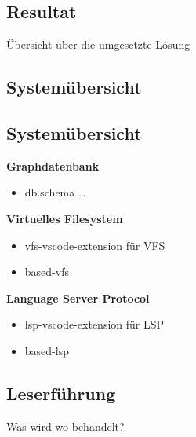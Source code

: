 \subsection{Resultat}
Übersicht über die umgesetzte Lösung

\subsection{Systemübersicht}

\subsection{Systemübersicht}

\textbf{Graphdatenbank}
\begin{itemize}
	\item db.schema …
\end{itemize}

\textbf{Virtuelles Filesystem}
\begin{itemize}
	\item vfs-vscode-extension für VFS
	\item based-vfs
\end{itemize}

\textbf{Language Server Protocol}
\begin{itemize}
	\item lsp-vscode-extension für LSP
	\item based-lsp
\end{itemize}

\subsection{Leserführung}
Was wird wo behandelt?